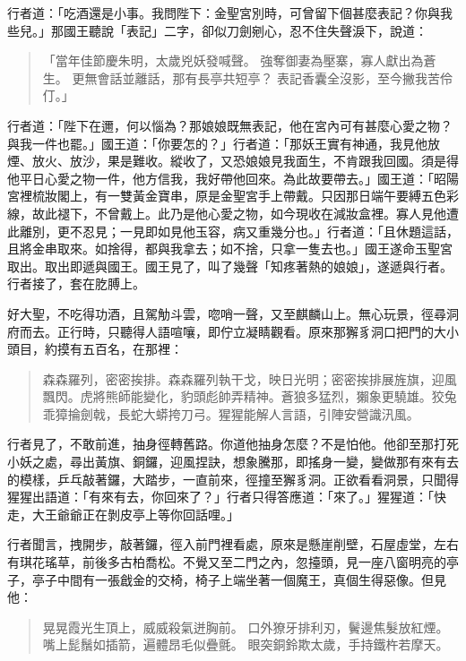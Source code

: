 行者道：「吃酒還是小事。我問陛下：金聖宮別時，可曾留下個甚麼表記？你與我些兒。」那國王聽說「表記」二字，卻似刀劍剜心，忍不住失聲淚下，說道：
\begin{quote}
「當年佳節慶朱明，太歲兇妖發喊聲。
強奪御妻為壓寨，寡人獻出為蒼生。
更無會話並離話，那有長亭共短亭？
表記香囊全沒影，至今撇我苦伶仃。」
\end{quote}

行者道：「陛下在邇，何以惱為？那娘娘既無表記，他在宮內可有甚麼心愛之物？與我一件也罷。」國王道：「你要怎的？」行者道：「那妖王實有神通，我見他放煙、放火、放沙，果是難收。縱收了，又恐娘娘見我面生，不肯跟我回國。須是得他平日心愛之物一件，他方信我，我好帶他回來。為此故要帶去。」國王道：「昭陽宮裡梳妝閣上，有一雙黃金寶串，原是金聖宮手上帶戴。只因那日端午要縛五色彩線，故此褪下，不曾戴上。此乃是他心愛之物，如今現收在減妝盒裡。寡人見他遭此離別，更不忍見；一見即如見他玉容，病又重幾分也。」行者道：「且休題這話，且將金串取來。如捨得，都與我拿去；如不捨，只拿一隻去也。」國王遂命玉聖宮取出。取出即遞與國王。國王見了，叫了幾聲「知疼著熱的娘娘」，遂遞與行者。行者接了，套在肐膊上。

好大聖，不吃得功酒，且駕觔斗雲，唿哨一聲，又至麒麟山上。無心玩景，徑尋洞府而去。正行時，只聽得人語喧嚷，即佇立凝睛觀看。原來那獬豸洞口把門的大小頭目，約摸有五百名，在那裡：
\begin{quote}
森森羅列，密密挨排。森森羅列執干戈，映日光明；密密挨排展旌旗，迎風飄閃。虎將熊師能變化，豹頭彪帥弄精神。蒼狼多猛烈，獺象更驍雄。狡兔乖獐掄劍戟，長蛇大蟒挎刀弓。猩猩能解人言語，引陣安營識汛風。
\end{quote}

行者見了，不敢前進，抽身徑轉舊路。你道他抽身怎麼？不是怕他。他卻至那打死小妖之處，尋出黃旗、銅鑼，迎風捏訣，想象騰那，即搖身一變，變做那有來有去的模樣，乒乓敲著鑼，大踏步，一直前來，徑撞至獬豸洞。正欲看看洞景，只聞得猩猩出語道：「有來有去，你回來了？」行者只得答應道：「來了。」猩猩道：「快走，大王爺爺正在剝皮亭上等你回話哩。」

行者聞言，拽開步，敲著鑼，徑入前門裡看處，原來是懸崖削壁，石屋虛堂，左右有琪花瑤草，前後多古柏喬松。不覺又至二門之內，忽擡頭，見一座八窗明亮的亭子，亭子中間有一張戧金的交椅，椅子上端坐著一個魔王，真個生得惡像。但見他：
\begin{quote}
晃晃霞光生頂上，威威殺氣迸胸前。
口外獠牙排利刃，鬢邊焦髮放紅煙。
嘴上髭鬚如插箭，遍體昂毛似疊氈。
眼突銅鈴欺太歲，手持鐵杵若摩天。
\end{quote}

